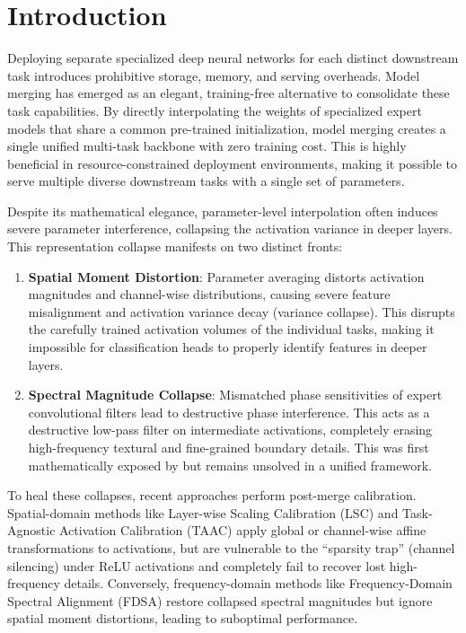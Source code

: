 \documentclass{article}
\begin{document}
\section{Introduction}
\label{sec:intro}
Deploying separate specialized deep neural networks for each distinct downstream task introduces prohibitive storage, memory, and serving overheads. Model merging has emerged as an elegant, training-free alternative \cite{wortsman22, ilharco22, yadav23, jin2023dataless} to consolidate these task capabilities. By directly interpolating the weights of specialized expert models that share a common pre-trained initialization, model merging creates a single unified multi-task backbone with zero training cost. This is highly beneficial in resource-constrained deployment environments, making it possible to serve multiple diverse downstream tasks with a single set of parameters.

Despite its mathematical elegance, parameter-level interpolation often induces severe parameter interference, collapsing the activation variance in deeper layers. This representation collapse manifests on two distinct fronts:
\begin{enumerate}
    \item \textbf{Spatial Moment Distortion}: Parameter averaging distorts activation magnitudes and channel-wise distributions, causing severe feature misalignment and activation variance decay (variance collapse). This disrupts the carefully trained activation volumes of the individual tasks, making it impossible for classification heads to properly identify features in deeper layers.
    \item \textbf{Spectral Magnitude Collapse}: Mismatched phase sensitivities of expert convolutional filters lead to destructive phase interference. This acts as a destructive low-pass filter on intermediate activations, completely erasing high-frequency textural and fine-grained boundary details. This was first mathematically exposed by \cite{visionary2026} but remains unsolved in a unified framework.
\end{enumerate}

To heal these collapses, recent approaches perform post-merge calibration. Spatial-domain methods like Layer-wise Scaling Calibration (LSC) and Task-Agnostic Activation Calibration (TAAC) \cite{anon2026b} apply global or channel-wise affine transformations to activations, but are vulnerable to the ``sparsity trap'' (channel silencing) under ReLU activations and completely fail to recover lost high-frequency details. Conversely, frequency-domain methods like Frequency-Domain Spectral Alignment (FDSA) \cite{visionary2026} restore collapsed spectral magnitudes but ignore spatial moment distortions, leading to suboptimal performance.
\end{document}
